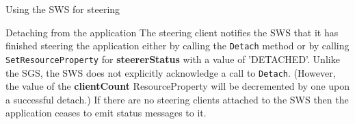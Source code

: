 \documentclass[a4paper]{article}
\begin{document}
\begin{section}{Using the SWS for steering}
\begin{subsection}{Detaching from the application}
The steering client notifies the SWS that it has finished steering the
application either by calling the \texttt{Detach} method or by calling
\texttt{SetResourceProperty} for {\bf steererStatus} with a value of
'DETACHED'.  Unlike the SGS, the SWS does not explicitly acknowledge
a call to \texttt{Detach}.  (However, the value of the {\bf clientCount}
ResourceProperty will be decremented by one upon a successful detach.)
If there are no steering clients attached to the SWS then the
application ceases to emit status messages to it.
\end{subsection}

\end{section}

\end{document}
